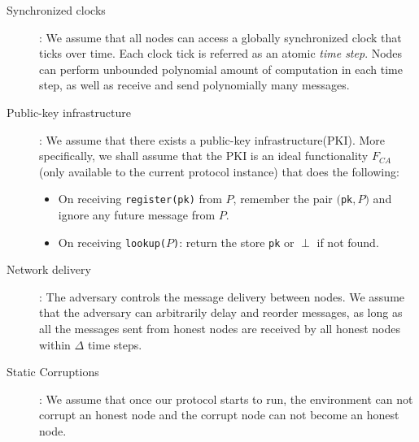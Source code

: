\documentclass[
10pt, %
a4paper, %
oneside, %
headinclude,footinclude, %
BCOR5mm, %
]{scrartcl}
\begin{document}
\begin{description}
\item[Synchronized clocks]:
We assume that all nodes can access a globally synchronized clock that ticks over time. Each clock tick is referred as an atomic \textit{time step}. Nodes can perform unbounded polynomial amount of computation in each time step, as well as receive and send polynomially many messages.
\item[Public-key infrastructure]:
We assume that there exists a public-key infrastructure(PKI). More specifically, we shall assume that the PKI is an ideal functionality $F_{CA}$(only available to the current protocol instance) that does the following:
\begin{itemize}
    \item On receiving \verb|register(pk)| from $P$, remember the pair $($\verb|pk|$, P)$ and ignore any future message from $P$.
    \item On receiving \verb|lookup(|$P$\verb|)|: return the store \verb|pk| or $\perp$ if not found.
\end{itemize}
\item[Network delivery]:
The adversary controls the message delivery between nodes. We assume that the adversary can arbitrarily delay and reorder messages, as long as all the messages sent from honest nodes are received by all honest nodes within $\Delta$ time steps.
\item[Static Corruptions]:
We assume that once our protocol starts to run, the environment can not corrupt an honest node and the corrupt node can not become an honest node.
\end{description}
\end{document}
